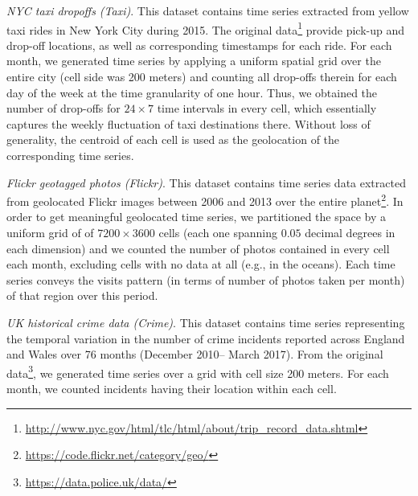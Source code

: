 
\emph{NYC taxi dropoffs (Taxi)}. This dataset contains time series extracted from yellow taxi rides in New York City during 2015. The original data\footnote{\url{http://www.nyc.gov/html/tlc/html/about/trip_record_data.shtml}} provide pick-up and drop-off locations, as well as corresponding timestamps for each ride. For each month, we generated time series by applying a uniform spatial grid over the entire city (cell side was 200 meters) and counting all drop-offs therein for each day of the week at the time granularity of one hour. Thus, we obtained the number of drop-offs for $24 \times 7$ time intervals in every cell, which essentially captures the weekly fluctuation of taxi destinations there. Without loss of generality, the centroid of each cell is used as the geolocation of the corresponding time series.

\emph{Flickr geotagged photos (Flickr)}. This dataset contains time series data extracted from geolocated Flickr images between 2006 and 2013 over the entire planet\footnote{\url{https://code.flickr.net/category/geo/}}. In order to get meaningful geolocated time series, we partitioned the space by a uniform grid of of $7200 \times 3600$ cells (each one spanning $0.05$ decimal degrees in each dimension) and we counted the number of photos contained in every cell each month, excluding cells with no data at all (e.g., in the oceans). Each time series conveys the visits pattern (in terms of number of photos taken per month) of that region over this period.

\emph{UK historical crime data (Crime)}. This dataset contains time series representing the temporal variation in the number of crime incidents reported across England and Wales over 76 months (December 2010-- March 2017). From the original data\footnote{\url{https://data.police.uk/data/}}, we generated time series over a grid with cell size 200 meters. For each month, we counted incidents having their location within each cell.




